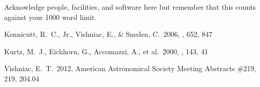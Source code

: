 \documentclass[RNAAS]{aastex62}
\begin{document}
\acknowledgments

Acknowledge people, facilities, and software here but remember that this counts
against your 1000 word limit.

\begin{thebibliography}{}

 Kennicutt, R.~C., Jr., Vishniac, E., \& Sneden, C.\ 2006, \apj, 652, 847

 Kurtz, M.~J., Eichhorn, G., Accomazzi, A., et al.\ 2000, \aaps, 143, 41

 Vishniac, E.~T.\ 2012, American Astronomical Society Meeting Abstracts \#219, 219, 204.04

\end{thebibliography}
\end{document}
